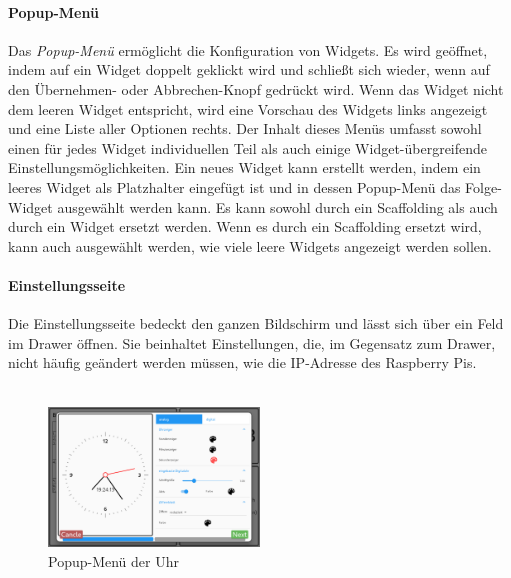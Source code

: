 \documentclass[10pt]{article}
\begin{document}
\paragraph{Popup-Menü} \label{popup}
Das \textit{Popup-Menü} ermöglicht die Konfiguration von Widgets. Es wird geöffnet, indem auf ein Widget doppelt geklickt wird und schließt sich wieder, wenn auf den Übernehmen- oder Abbrechen-Knopf gedrückt wird. Wenn das Widget nicht dem leeren Widget entspricht, wird eine Vorschau des Widgets links angezeigt und eine Liste aller Optionen rechts. Der Inhalt dieses Menüs umfasst sowohl einen für jedes Widget individuellen Teil als auch einige Widget-übergreifende Einstellungsmöglichkeiten. 
Ein neues Widget kann erstellt werden, indem ein leeres Widget als Platzhalter eingefügt ist und in dessen Popup-Menü das Folge-Widget ausgewählt werden kann. 
Es kann sowohl durch ein Scaffolding als auch durch ein Widget ersetzt werden. Wenn es durch ein Scaffolding ersetzt wird, kann auch ausgewählt werden, wie viele leere Widgets angezeigt werden sollen. 

\paragraph{Einstellungsseite}
Die Einstellungsseite bedeckt den ganzen Bildschirm und lässt sich über ein Feld im Drawer öffnen. Sie beinhaltet Einstellungen, die, im Gegensatz zum Drawer, nicht häufig geändert werden müssen, wie die IP-Adresse des Raspberry Pis.
\\\\
\begin{figure}
  \centering \includegraphics[width=0.5\textwidth]{Screenshot_20230113_192414.png}
  \caption{Popup-Menü der Uhr}
\end{figure}
\end{document}
